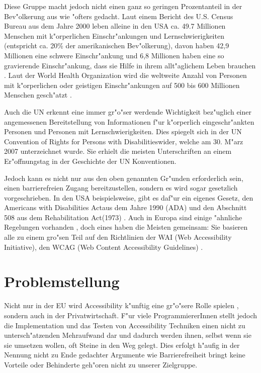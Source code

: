 \documentclass[a4paper,bibtotoc,oneside]{scrbook}
\begin{document}
Diese Gruppe macht jedoch nicht einen ganz so geringen Prozentanteil in der Bev"olkerung aus wie "ofters gedacht. Laut einem Bericht des U.S. Census Bureau aus dem Jahre 2000 leben alleine in den USA ca. 49.7 Millionen Menschen mit k"orperlichen Einschr"ankungen und Lernschwierigkeiten (entspricht ca. 20\% der amerikanischen Bev"olkerung), davon haben 42,9 Millionen eine schwere Einschr"ankung und 6,8 Millionen haben eine so gravierende Einschr"ankung, dass sie Hilfe in ihrem allt"aglichem Leben brauchen \cite[S. 1]{us_cens}. Laut der World Health Organization wird die weltweite Anzahl von Personen mit k"orperlichen oder geistigen Einschr"ankungen auf 500 bis 600 Millionen Menschen gesch"atzt \cite{who_dis}.

Auch die UN erkennt eine immer gr"o"ser werdende Wichtigkeit bez"uglich einer angemessenen Bereitstellung von Informationen f"ur k"orperlich eingeschr"ankten Personen und Personen mit Lernschwierigkeiten. Dies spiegelt sich in der \glqq UN Convention of Rights for Persons with Disabilities\grqq wider, welche am 30. M"arz 2007 unterzeichnet wurde. Sie erhielt die \glqq meisten Unterschriften an einem Er"offnungstag in der Geschichte der UN Konventionen\grqq \cite{un_disabilities}. 

Jedoch kann es nicht nur aus den oben genannten Gr"unden erforderlich sein,
einen barrierefreien Zugang bereitzustellen, sondern es wird sogar gesetzlich
vorgeschrieben. In den USA beispielsweise, gibt es daf"ur ein eigenes
Gesetz, den \glqq Americans with Disabilities Act\grqq aus dem Jahre 1990 (ADA) und den Abschnitt 508 aus dem \glqq Rehabilitation Act\grqq (1973) \cite[S. 288-289]{achieving_web_acc}. Auch in Europa sind einige "ahnliche Regelungen vorhanden \cite[S. 7]{mod_software}, doch eines haben die Meisten gemeinsam: Sie basieren alle zu einem gro"sen Teil auf den Richtlinien der WAI (Web Accessibility Initiative), den WCAG (Web Content Accessibility Guidelines) \cite[S. 289]{achieving_web_acc} \cite[S. 7]{mod_software}.

\section{Problemstellung}
Nicht nur in der EU wird Accessibility k"unftig eine gr"o"sere Rolle spielen \cite[Abschnitt EU]{w3c_pol}, sondern auch in der Privatwirtschaft. F"ur viele ProgrammiererInnen stellt jedoch die Implementation und das Testen von Accessibility Techniken einen nicht zu untersch"atzenden Mehraufwand dar \cite[S. 27]{understand_acc} und dadurch werden ihnen, selbst wenn sie sie umsetzen wollen, oft Steine in den Weg gelegt. Dies erfolgt h"aufig in der Nennung nicht zu Ende gedachter Argumente wie \glqq Barrierefreiheit bringt keine Vorteile\grqq \cite[S. 28]{understand_acc} oder \glqq Behinderte geh"oren nicht zu unserer Zielgruppe\grqq \cite[S. 31]{understand_acc}.
\end{document}

